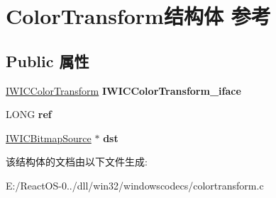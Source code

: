 \hypertarget{struct_color_transform}{}\section{Color\+Transform结构体 参考}
\label{struct_color_transform}
\subsection*{Public 属性}
\begin{DoxyCompactItemize}
\item 
\mbox{\label{struct_color_transform_a10f9faaad9229449c63cc68755a74957}} 
\hyperlink{interface_i_w_i_c_color_transform}{I\+W\+I\+C\+Color\+Transform} {\bfseries I\+W\+I\+C\+Color\+Transform\+\_\+iface}
\item 
\mbox{\label{struct_color_transform_a09234f9557d92dc4afeac8878ee1a879}} 
L\+O\+NG {\bfseries ref}
\item 
\mbox{\label{struct_color_transform_a7ea550168beff7a643b12c2c2ae6c26a}} 
\hyperlink{interface_i_w_i_c_bitmap_source}{I\+W\+I\+C\+Bitmap\+Source} $\ast$ {\bfseries dst}
\end{DoxyCompactItemize}


该结构体的文档由以下文件生成\+:\begin{DoxyCompactItemize}
\item 
E\+:/\+React\+O\+S-\/0../dll/win32/windowscodecs/colortransform.\+c\end{DoxyCompactItemize}
